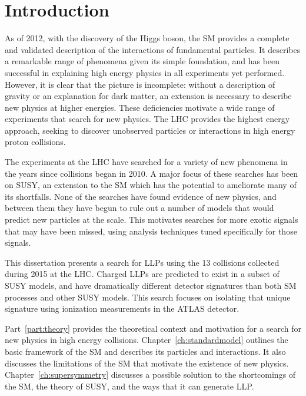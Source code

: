 \chapter{Introduction}

\label{ch:introduction}

As of 2012, with the discovery of the Higgs boson, the \ac{SM} provides a complete and validated description of the interactions of fundamental particles.
It describes a remarkable range of phenomena given its simple foundation, and has been successful in explaining high energy physics in all experiments yet performed.
However, it is clear that the picture is incomplete: without a description of gravity or an explanation for dark matter, an extension is necessary to describe new physics at higher energies.
These deficiencies motivate a wide range of experiments that search for new physics.
The \ac{LHC} provides the highest energy approach, seeking to discover unobserved particles or interactions in high energy proton collisions.

The experiments at the \ac{LHC} have searched for a variety of new phenomena in the years since collisions began in 2010.
A major focus of these searches has been on \ac{SUSY}, an extension to the \ac{SM} which has the potential to ameliorate many of its shortfalls.
None of the searches have found evidence of new physics, and between them they have begun to rule out a number of models that would predict new particles at the \TeV scale.
This motivates searches for more exotic signals that may have been missed, using analysis techniques tuned specifically for those signals.

This dissertation presents a search for \acp{LLP} using the 13 \TeV collisions collected during 2015 at the \ac{LHC}.
Charged \acp{LLP} are predicted to exist in a subset of \ac{SUSY} models, and have dramatically different detector signatures than both \ac{SM} processes and other \ac{SUSY} models.
This search focuses on isolating that unique signature using ionization measurements in the ATLAS detector. 

Part~\ref{part:theory} provides the theoretical context and motivation for a search for new physics in high energy collisions.
Chapter~\ref{ch:standardmodel} outlines the basic framework of the \ac{SM} and describes its particles and interactions.
It also discusses the limitations of the \ac{SM} that motivate the existence of new physics.
Chapter~\ref{ch:supersymmetry} discusses a possible solution to the shortcomings of the \ac{SM}, the theory of \acl{SUSY}, and the ways that it can generate \ac{LLP}.

